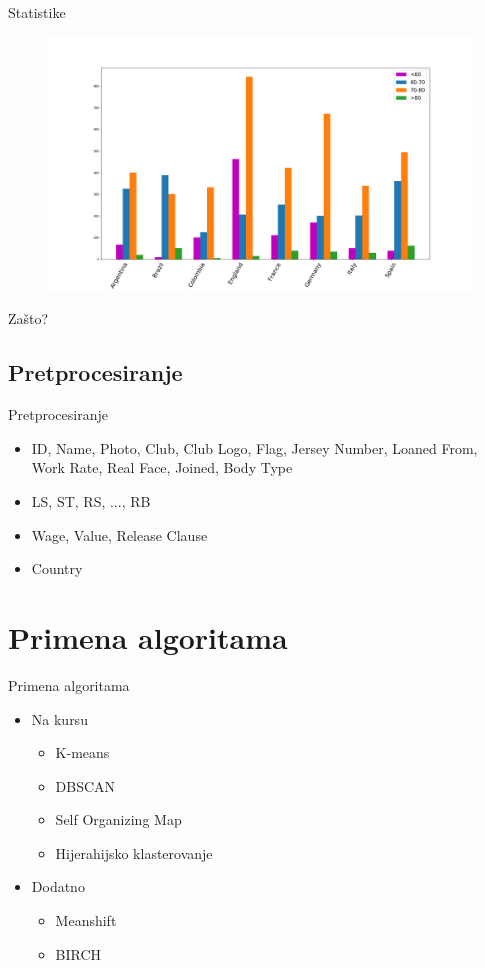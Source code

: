 \documentclass[12pt]{beamer}
\begin{document}
\begin{frame}[t]{Statistike}
\begin{figure}
\includegraphics[scale=0.15]{../stat3} 

\end{figure}\pause
Zašto?
\end{frame}

\subsection{Pretprocesiranje}
\begin{frame}{Pretprocesiranje}
\begin{itemize}
\item
ID, Name,
Photo, Club, Club Logo, Flag, Jersey Number, Loaned From, Work Rate,
Real Face, Joined, Body Type \pause
\item LS, ST, RS, ..., RB \pause
\item Wage, Value, Release Clause \pause
\item Country
\end{itemize}
\end{frame}


\section{Primena algoritama}
\begin{frame}{Primena algoritama}
\begin{itemize}
\item Na kursu
\begin{itemize}
\item K-means
\item DBSCAN
\item Self Organizing Map
\item Hijerahijsko klasterovanje
\end{itemize}
\item Dodatno
\begin{itemize}
\item Meanshift
\item BIRCH
\end{itemize}
\end{itemize}

\end{frame}
\end{document}
